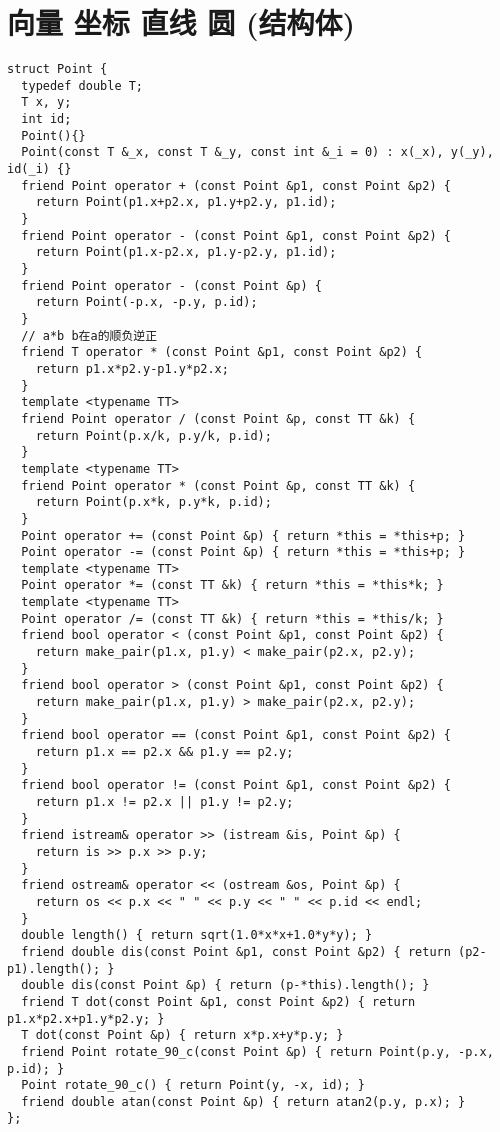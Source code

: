 \documentclass[12pt]{article}
\begin{document}
{{{{{{{{{{\section{ 向量 坐标 直线 圆 (结构体)}
{\setmainfont{Consolas}
\begin{lstlisting}
struct Point {
  typedef double T;
  T x, y;
  int id;
  Point(){}
  Point(const T &_x, const T &_y, const int &_i = 0) : x(_x), y(_y), id(_i) {}
  friend Point operator + (const Point &p1, const Point &p2) {
    return Point(p1.x+p2.x, p1.y+p2.y, p1.id);
  }
  friend Point operator - (const Point &p1, const Point &p2) {
    return Point(p1.x-p2.x, p1.y-p2.y, p1.id);
  }
  friend Point operator - (const Point &p) {
    return Point(-p.x, -p.y, p.id);
  }
  // a*b b在a的顺负逆正
  friend T operator * (const Point &p1, const Point &p2) {
    return p1.x*p2.y-p1.y*p2.x;
  }
  template <typename TT>
  friend Point operator / (const Point &p, const TT &k) {
    return Point(p.x/k, p.y/k, p.id);
  }
  template <typename TT>
  friend Point operator * (const Point &p, const TT &k) {
    return Point(p.x*k, p.y*k, p.id);
  }
  Point operator += (const Point &p) { return *this = *this+p; }
  Point operator -= (const Point &p) { return *this = *this+p; }
  template <typename TT>
  Point operator *= (const TT &k) { return *this = *this*k; }
  template <typename TT>
  Point operator /= (const TT &k) { return *this = *this/k; }
  friend bool operator < (const Point &p1, const Point &p2) {
    return make_pair(p1.x, p1.y) < make_pair(p2.x, p2.y);
  }
  friend bool operator > (const Point &p1, const Point &p2) {
    return make_pair(p1.x, p1.y) > make_pair(p2.x, p2.y);
  }
  friend bool operator == (const Point &p1, const Point &p2) {
    return p1.x == p2.x && p1.y == p2.y;
  }
  friend bool operator != (const Point &p1, const Point &p2) {
    return p1.x != p2.x || p1.y != p2.y;
  }
  friend istream& operator >> (istream &is, Point &p) {
    return is >> p.x >> p.y;
  }
  friend ostream& operator << (ostream &os, Point &p) {
    return os << p.x << " " << p.y << " " << p.id << endl;
  }
  double length() { return sqrt(1.0*x*x+1.0*y*y); }
  friend double dis(const Point &p1, const Point &p2) { return (p2-p1).length(); }
  double dis(const Point &p) { return (p-*this).length(); }
  friend T dot(const Point &p1, const Point &p2) { return p1.x*p2.x+p1.y*p2.y; }
  T dot(const Point &p) { return x*p.x+y*p.y; }
  friend Point rotate_90_c(const Point &p) { return Point(p.y, -p.x, p.id); }
  Point rotate_90_c() { return Point(y, -x, id); }
  friend double atan(const Point &p) { return atan2(p.y, p.x); }
};


\end{lstlisting}}}}}}}}}}}}
\end{document}
